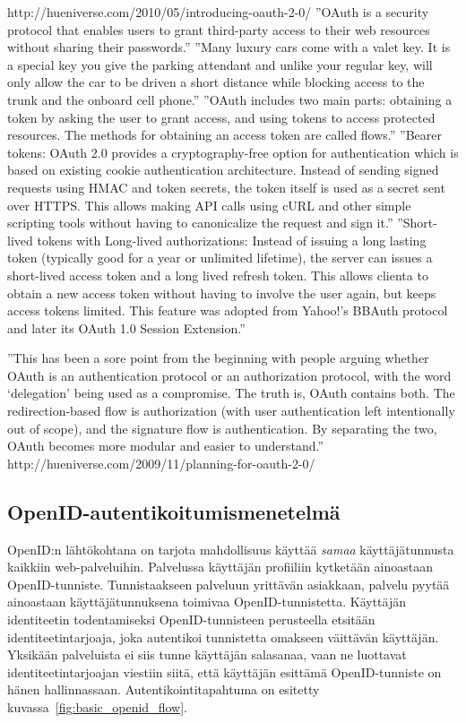 \documentclass[english,gradu]{tktltiki}
\begin{document}
http://hueniverse.com/2010/05/introducing-oauth-2-0/
''OAuth is a security protocol that enables users to grant third-party access to their web resources without sharing their passwords.''
''Many luxury cars come with a valet key. It is a special key you give the parking attendant and unlike your regular key, will only allow the car to be driven a short distance while blocking access to the trunk and the onboard cell phone.''
''OAuth includes two main parts: obtaining a token by asking the user to grant access, and using tokens to access protected resources. The methods for obtaining an access token are called flows.''
''Bearer tokens: OAuth 2.0 provides a cryptography-free option for authentication which is based on existing cookie authentication architecture. Instead of sending signed requests using HMAC and token secrets, the token itself is used as a secret sent over HTTPS. This allows making API calls using cURL and other simple scripting tools without having to canonicalize the request and sign it.''
''Short-lived tokens with Long-lived authorizations: Instead of issuing a long lasting token (typically good for a year or unlimited lifetime), the server can issues a short-lived access token and a long lived refresh token. This allows clienta to obtain a new access token without having to involve the user again, but keeps access tokens limited. This feature was adopted from Yahoo!’s BBAuth protocol and later its OAuth 1.0 Session Extension.''


''This has been a sore point from the beginning with people arguing whether OAuth is an authentication protocol or an authorization protocol, with the word ‘delegation’ being used as a compromise. The truth is, OAuth contains both. The redirection-based flow is authorization (with user authentication left intentionally out of scope), and the signature flow is authentication. By separating the two, OAuth becomes more modular and easier to understand.'' http://hueniverse.com/2009/11/planning-for-oauth-2-0/



\subsection{OpenID-autentikoitumismenetelmä} %
\label{sub:openid_autentikoitumismenetelmä}

\label{sec:openid_auth}

OpenID:n lähtökohtana on tarjota mahdollisuus käyttää \emph{samaa} käyttäjätunnusta kaikkiin web-palveluihin.
Palvelussa käyttäjän profiiliin kytketään ainoastaan OpenID-tunniste. Tunnistaakseen palveluun yrittävän asiakkaan, palvelu pyytää ainoastaan käyttäjätunnuksena toimivaa OpenID-tunnistetta. Käyttäjän identiteetin todentamiseksi OpenID-tunnisteen perusteella etsitään identiteetintarjoaja, joka autentikoi tunnistetta omakseen väittävän käyttäjän. Yksikään palveluista ei siis tunne käyttäjän salasanaa, vaan ne luottavat identiteetintarjoajan viestiin siitä, että käyttäjän esittämä OpenID-tunniste on hänen hallinnassaan. Autentikointitapahtuma on esitetty kuvassa~\ref{fig:basic_openid_flow}.
\end{document}
